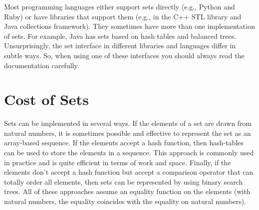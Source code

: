 \begin{remark}
Most programming languages either support sets directly (e.g., Python and Ruby)
or have libraries that support them (e.g., in the C++ STL library and Java
collections framework).  They sometimes have more than one implementation of
sets.  For example, Java has sets based on hash tables and balanced trees.
Unsurprisingly, the set interface in different libraries and languages differ in
subtle ways.  So, when using one of these interfaces you should always read the
documentation carefully.
\end{remark}


\section{Cost of Sets}

\begin{gram}
Sets can be implemented in several ways. 
%
If the elements of a set are drawn from natural numbers, it is sometimes possible and effective to represent the set as an array-based sequence.
%
If the elements accept a hash function, then hash-tables can be used to store the elements in a sequence.  This approach is commonly used in practice and is quite efficient in terms of work and space.
%
Finally, if the elements don't accept a hash function but accept a comparison operator that can totally order all elements, then sets can be represented by using binary search trees.
%
All of these approaches assume an equality function on the elements (with natural numbers, the equality coincides with the equality on natural numbers).

%
\end{gram}

